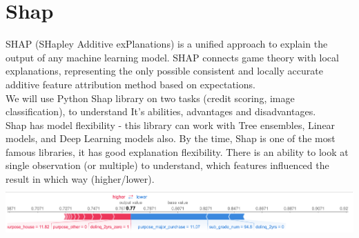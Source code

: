 \section{Shap}
SHAP (SHapley Additive exPlanations) is a unified approach to explain the output of any machine learning model. SHAP connects game theory with local explanations, representing the only possible consistent and locally accurate additive feature attribution method based on expectations. \\
We will use Python Shap library on two tasks (credit scoring, image classification), to understand It's abilities, advantages and disadvantages.\\
Shap has model flexibility - this library can work with Tree ensembles, Linear models, and Deep Learning models also. By the time, Shap is one of the most famous libraries, it has good explanation flexibility. There is an ability to look at single observation (or multiple) to understand, which features influenced the result in which way (higher/lower). \\
\includegraphics[height=2cm]{shap_ex1.png}\\[0.5cm] 


\newpage
\printbibliography
